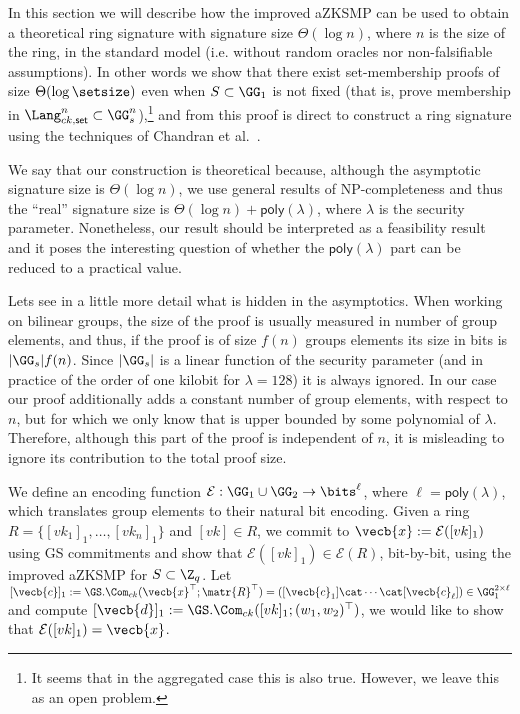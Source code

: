 In this section we will describe how the improved aZKSMP can be used to obtain a {theoretical} ring signature with signature size \(\Theta(\log n)\), where \(n\) is the size of the ring, in the standard model (i.e. without {random oracles} nor {non-falsifiable  assumptions}). In other words we show that there exist set-membership proofs of size \(\Theta(\log \setsize )\) even when \(S\subset \GG_1\) is not fixed (that is, prove membership in $\Lang_{ck,\mathsf{set}}^n\subset\GG_s^n$),\footnote{It seems that in the aggregated case this is also true. However, we leave this as an open problem.} and from this proof is direct to construct a ring signature using the techniques of Chandran et al.~\cite{ICALP:ChaGroSah07}.

We say that our construction is theoretical because, although the asymptotic signature size is \(\Theta(\log n)\), we use general results of NP-completeness and thus the ``real'' signature size is \(\Theta(\log n)+\mathsf{poly}(\lambda)\), where \(\lambda\) is the security parameter. Nonetheless, our result should be interpreted as a feasibility result and it poses the interesting question of whether the \(\mathsf{poly}(\lambda)\) part can be reduced to a practical value.

Lets see in a little more detail what is hidden in the asymptotics. When working on bilinear groups, the size of the proof is usually measured in number of group elements, and thus, if the proof is of size $f(n)$ groups elements its size in bits is $|\GG_s|f(n)$. Since $|\GG_s|$ is a linear function of the security parameter (and in practice of the order of one kilobit for $\lambda=128$) it is always ignored. In our case our proof additionally adds a constant number of group elements, with respect to $n$, but for which we only know that is upper bounded by some polynomial of $\lambda$. Therefore, although this part of the proof is independent of $n$, it is misleading to ignore its contribution to the total proof size.
 
We define an encoding function \(\mathcal{E}:\GG_1\cup\GG_2\to\bits^\ell\), where \(\ell=\mathsf{poly}(\lambda)\), which translates group elements to their natural bit encoding. Given a ring \(R=\{[vk_1]_1,\ldots,[vk_n]_1\}\) and \([vk]\in R\), we commit to \(\vecb{x}:=\mathcal{E}([vk]_1)\) using GS commitments and show that \(\mathcal{E}([vk]_1)\in\mathcal{E}(R)\), bit-by-bit, using the improved aZKSMP for \(S\subset \Z_q\). Let \([\vecb{c}]_1:=\GS.\Com_{ck}(\vecb{x}^\top;\matr{R}^\top)=([\vecb{c}_1]\cat\cdots\cat[\vecb{c}_\ell])\in\GG_1^{2\times \ell}\) and compute \([\vecb{d}]_1:=\GS.\Com_{ck}([vk]_1;(w_1,w_2)^\top)\), we would like to show that \(\mathcal{E}([vk]_1)=\vecb{x}\).

